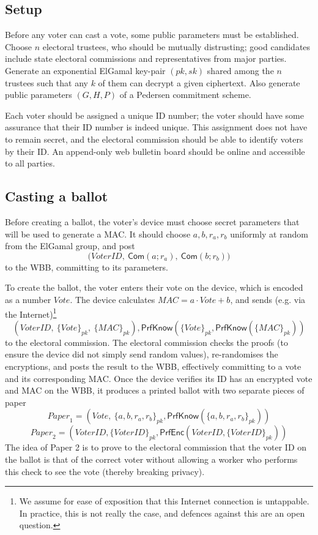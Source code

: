 \documentclass[12pt,a4paper]{article}
\newcommand{\commit}{\mathsf{Com}}
\newcommand{\PrfEnc}{\mathsf{PrfEnc}}
\newcommand{\PrfKnow}{\mathsf{PrfKnow}}
\theoremstyle{definition}
\newcommand{\Vote}{\mathit{Vote}}
\newcommand{\VoterID}{\mathit{VoterID}}
\newcommand{\Paper}{\mathit{Paper}}
\newcommand{\Mac}{\mathit{MAC}}
\begin{document}
\subsection{Setup}
Before any voter can cast a vote, some public parameters must be established. Choose $n$ electoral trustees, who should be mutually distrusting; good candidates include state electoral commissions and representatives from major parties. Generate an exponential ElGamal key-pair $(pk, sk)$ shared among the $n$ trustees such that any $k$ of them can decrypt a given ciphertext. Also generate public parameters $(G, H, P)$ of a Pedersen commitment scheme.

Each voter should be assigned a unique ID number; the voter should have some assurance that their ID number is indeed unique. This assignment does not have to remain secret, and the electoral commission should be able to identify voters by their ID. An append-only web bulletin board should be online and accessible to all parties.
\subsection{Casting a ballot}
Before creating a ballot, the voter's device must choose secret parameters that will be used to generate a MAC. It should choose $a,b,r_a,r_b$ uniformly at random from the ElGamal group, and post
$$\big(\VoterID,\ \commit(a;r_a),\ \commit(b;r_b)\big)$$
to the WBB, committing to its parameters.

To create the ballot, the voter enters their vote on the device, which is encoded as a number $\Vote$. The device calculates $\Mac=a\cdot \Vote+b$, and sends (e.g. via the Internet)\footnote{We assume for ease of exposition that this Internet connection is untappable. In practice, this is not really the case, and defences against this are an open question.}
$$\left(\VoterID,\ \{\Vote\}_{pk},\ \{\Mac\}_{pk}\right), \PrfKnow(\{\Vote\}_{pk}, \PrfKnow(\{\Mac\}_{pk}))$$
to the electoral commission. The electoral commission checks the proofs (to ensure the device did not simply send random values), re-randomises the encryptions, and posts the result to the WBB, effectively committing to a vote and its corresponding MAC. Once the device verifies its ID has an encrypted vote and MAC on the WBB, it produces a printed ballot with two separate pieces of paper
$$\Paper_1 = \left(\Vote,\ \{a,b,r_a,r_b\}_{pk}, \PrfKnow(\{a,b,r_a,r_b\}_{pk})\right)$$
$$\Paper_2 = \left(\VoterID, \{\VoterID\}_{pk}, \PrfEnc(\VoterID, \{\VoterID\}_{pk})\right)$$
The idea of Paper 2 is to prove to the electoral commission that the voter ID on the ballot is that of the correct voter without allowing a worker who performs this check to see the vote (thereby breaking privacy).
\end{document}
